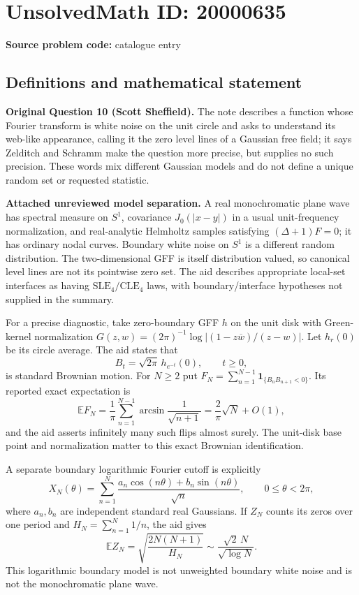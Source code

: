 \documentclass[11pt]{article}
\newcommand{\E}{\mathbb{E}}
\begin{document}
\section*{UnsolvedMath ID: 20000635}
\textbf{Source problem code:} catalogue entry
\subsection{Definitions and mathematical statement}
\textbf{Original Question 10 (Scott Sheffield).} The note describes a function whose Fourier transform is white noise on the unit circle and asks to understand its web-like appearance, calling it the zero level lines of a Gaussian free field; it says Zelditch and Schramm make the question more precise, but supplies no such precision. These words mix different Gaussian models and do not define a unique random set or requested statistic.

\textbf{Attached unreviewed model separation.} A real monochromatic plane wave has spectral measure on $S^1$, covariance $J_0(|x-y|)$ in a usual unit-frequency normalization, and real-analytic Helmholtz samples satisfying $(\Delta+1)F=0$; it has ordinary nodal curves. Boundary white noise on $S^1$ is a different random distribution. The two-dimensional GFF is itself distribution valued, so canonical level lines are not its pointwise zero set. The aid describes appropriate local-set interfaces as having $\mathrm{SLE}_4/\mathrm{CLE}_4$ laws, with boundary/interface hypotheses not supplied in the summary.

For a precise diagnostic, take zero-boundary GFF $h$ on the unit disk with Green-kernel normalization $G(z,w)=(2\pi)^{-1}\log|(1-z\overline w)/(z-w)|$. Let $h_r(0)$ be its circle average. The aid states that
\[B_t=\sqrt{2\pi}\,h_{e^{-t}}(0),\qquad t\ge0,\]
is standard Brownian motion. For $N\ge2$ put $F_N=\sum_{n=1}^{N-1}\mathbf1_{\{B_nB_{n+1}<0\}}$. Its reported exact expectation is
\[\E F_N=\frac1\pi\sum_{n=1}^{N-1}\arcsin\frac1{\sqrt{n+1}}=\frac2\pi\sqrt N+O(1),\]
and the aid asserts infinitely many such flips almost surely. The unit-disk base point and normalization matter to this exact Brownian identification.

A separate boundary logarithmic Fourier cutoff is explicitly
\[X_N(\theta)=\sum_{n=1}^N\frac{a_n\cos(n\theta)+b_n\sin(n\theta)}{\sqrt n},\qquad0\le\theta<2\pi,\]
where $a_n,b_n$ are independent standard real Gaussians. If $Z_N$ counts its zeros over one period and $H_N=\sum_{n=1}^N1/n$, the aid gives
\[\E Z_N=\sqrt{\frac{2N(N+1)}{H_N}}\sim\frac{\sqrt2\,N}{\sqrt{\log N}}.\]
This logarithmic boundary model is not unweighted boundary white noise and is not the monochromatic plane wave.
\end{document}
